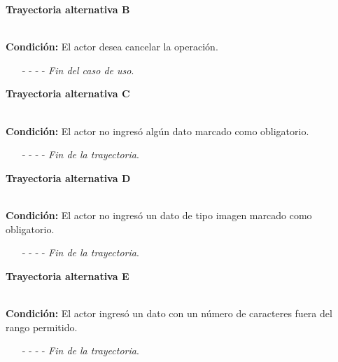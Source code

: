 \hypertarget{CU11-1-1-2:TAB}{\textbf{Trayectoria alternativa B}}\\
\noindent \textbf{Condición:} El actor desea cancelar la operación.
\begin{enumerate}
	\UCpaso[\UCactor] Solicita cancelar la operación oprimiendo el botón  de la pantalla .
	\UCpaso[\UCsist] Muestra la pantalla .
	\item[- -] - - {\em {Fin del caso de uso}}.%
\end{enumerate}
\hypertarget{CU11-1-1-2:TAC}{\textbf{Trayectoria alternativa C}}\\
\noindent \textbf{Condición:} El actor no ingresó algún dato marcado como obligatorio.
\begin{enumerate}
	\UCpaso[\UCsist] Muestra el mensaje  señalando el campo que presenta el error en la pantalla .
	\UCpaso Regresa al paso \ref{CU11.1.2-P4} de la trayectoria principal.
	\item[- -] - - {\em {Fin de la trayectoria}}.%
\end{enumerate}
\hypertarget{CU11-1-1-1:TAD}{\textbf{Trayectoria alternativa D}}\\
\noindent \textbf{Condición:} El actor no ingresó un dato de tipo imagen marcado como obligatorio.
\begin{enumerate}
	\UCpaso[\UCsist] Muestra el mensaje  señalando el campo que presenta el error en la pantalla .
	\UCpaso Regresa al paso \ref{CU11.1-P3} de la trayectoria principal.
	\item[- -] - - {\em {Fin de la trayectoria}}.%
\end{enumerate}
\hypertarget{CU11-1-1-2:TAE}{\textbf{Trayectoria alternativa E}}\\
\noindent \textbf{Condición:} El actor ingresó un dato con un número de caracteres fuera del rango permitido.
\begin{enumerate}
	\UCpaso[\UCsist] Muestra el mensaje  señalando el campo que presenta el error en la pantalla .
	\UCpaso Regresa al paso \ref{CU11.1.2-P4} de la trayectoria principal.
	\item[- -] - - {\em {Fin de la trayectoria}}.%
\end{enumerate}
